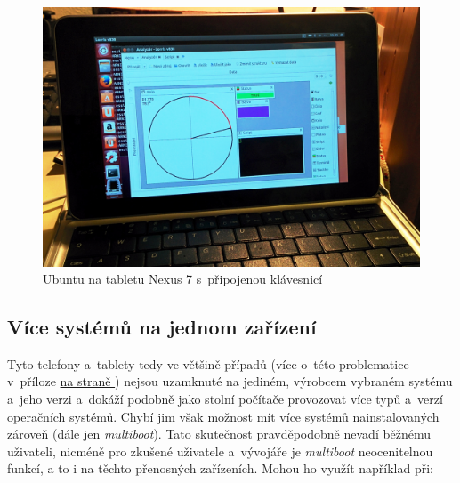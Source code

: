 \documentclass[12pt, a4paper, oneside]{article}
\newcommand{\It}{\textit}  %
\newcommand*{\attref}[1]{\hyperref[{#1}]{\uv{\nameref*{#1}} na straně \pageref{#1}}}
\begin{document}
\begin{figure}[H]
\begin{center}
\includegraphics[width=\textwidth]{img/n7_ubuntu.jpg}
\caption{Ubuntu na tabletu Nexus 7 s~připojenou klávesnicí}
\end{center}
\end{figure}

\subsection{Více systémů na jednom zařízení}
Tyto telefony a~tablety tedy ve většině případů (více o~této problematice v~příloze \attref{sec:locked}) nejsou uzamknuté na jediném, výrobcem vybraném systému a~jeho verzi a~dokáží podobně jako stolní počítače provozovat více typů a~verzí operačních systémů. Chybí jim však možnost mít více systémů nainstalovaných zároveň (dále jen \It{multiboot}). Tato skutečnost pravděpodobně nevadí běžnému uživateli, nicméně pro zkušené uživatele a~vývojáře je \It{multiboot} neocenitelnou funkcí, a to i na těchto přenosných zařízeních. Mohou ho využít například při:
\end{document}
